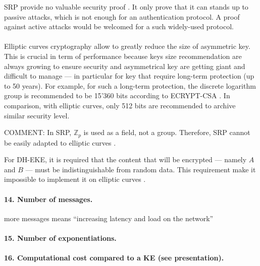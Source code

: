 \documentclass[../report.tex]{subfiles}
\begin{document}
SRP provide no valuable security proof \cite{CAA, SRP_Green_blog}. It only prove that it can stands up to passive attacks, which is not enough for an authentication protocol. A proof against active attacks would be welcomed for a such widely-used protocol.

\paragraph{}
Elliptic curves cryptography allow to greatly reduce the size of asymmetric key.
This is crucial in term of performance because keys size recommendation are always growing to ensure security and asymmetrical key are getting giant and difficult to manage --- in particular for key that require long-term protection (up to 50 years). For example, for such a long-term protection, the discrete logarithm group is recommended to be 15'360 bits according to ECRYPT-CSA \cite{https://www.keylength.com/en/3/}.
In comparison, with elliptic curves, only 512 bits are recommended to archive similar security level.

COMMENT: 
In SRP, $\mathbb{Z}_p$ is used as a field, not a group. Therefore, SRP cannot be easily adapted to elliptic curves \cite{CAA}. %


For DH-EKE, it is required that the content that will be encrypted --- namely $A$ and $B$ --- must be indistinguishable from random data. 
This requirement make it impossible to implement it on elliptic curves \cite{https://tools.ietf.org/id/draft-ietf-kitten-krb-spake-preauth-00.html}. %


\paragraph{14. Number of messages.}
more messages means ``increasing latency and load on the network''


\paragraph{15. Number of exponentiations.}


\paragraph{16. Computational cost compared to a KE (see \cite{KHAPE_Paper} presentation).}
\end{document}
